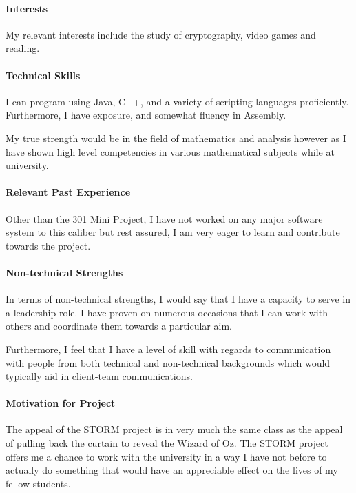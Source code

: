 \documentclass[12pt]{article}
\begin{document}
\paragraph{Interests}
My relevant interests include the study of cryptography, video games and reading.
\paragraph{Technical Skills}
I can program using Java, C++, and a variety of scripting languages proficiently.
Furthermore, I have exposure, and somewhat fluency in Assembly.

My true strength would be in the field of mathematics and analysis however as I have shown high level competencies in various mathematical subjects while at university.
\paragraph{Relevant Past Experience}
Other than the 301 Mini Project, I have not worked on any major software system to this caliber but rest assured, I am very eager to learn and contribute towards the project.
\paragraph{Non-technical Strengths}
In terms of non-technical strengths, I would say that I have a capacity to serve in a leadership role. I have proven on numerous occasions that I can work with others and coordinate them towards a particular aim.

Furthermore, I feel that I have a level of skill with regards to communication with people from both technical and non-technical backgrounds which would typically aid in client-team communications.
\paragraph{Motivation for Project}
The appeal of the STORM project is in very much the same class as the appeal of pulling back the curtain to reveal the Wizard of Oz. The STORM project offers me a chance to work with the university in a way I have not before to actually do something that would have an appreciable effect on the lives of my fellow students.
\end{document}
